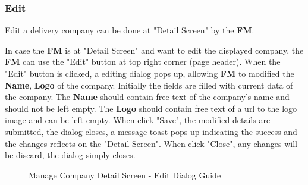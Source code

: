 \subsubsection{Edit}

Edit a delivery company can be done at "Detail Screen" by the \textbf{FM}.
\bigskip

In case the \textbf{FM} is at "Detail Screen" and want to edit the displayed company, the \textbf{FM} can use the "Edit" button at top right corner (page header). 
When the "Edit" button is clicked, a editing dialog pops up, allowing \textbf{FM} to modified the \textbf{Name}, \textbf{Logo} of the company. Initially the fields are filled with current data of the company. The \textbf{Name} should contain free text of the company's name and should not be left empty. The \textbf{Logo} should contain free text of a url to the logo image and can be left empty.
When click "Save", the modified details are submitted, the dialog closes, a message toast pops up indicating the success and the changes reflects on the "Detail Screen". When click "Close", any changes will be discard, the dialog simply closes.

\begin{figure}[H]
	\centering
    \vspace{5pt}
    \hspace{5pt}
    \caption{Manage Company Detail Screen - Edit Dialog Guide}
	\label{fig:MCDetailEditBtn}
\end{figure}

